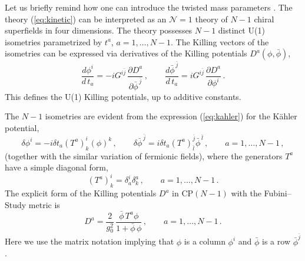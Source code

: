 \documentclass[epsfig,12pt]{article}
\def\beq{\begin{equation}}
\def\eeq{\end{equation}}
\def\beq{\begin{equation}}
\def\eeq{\end{equation}}
\begin{document}
Let us  briefly remind how one can introduce the twisted mass parameters \cite{twisted, Dor}.
The theory (\ref{eq:kinetic}) can be interpreted as an ${\mathcal N}=1$ theory of $N-1$ chiral superfields 
in four dimensions.  The theory possesses $N-1$ distinct   U(1) isometries 
parametrized by $t^{a}$, $a=1,\ldots,N-1$.
The Killing vectors of the isometries can be expressed via derivatives of the Killing 
potentials $D^{a}(\phi, \bar\phi)$,
\begin{equation}
\label{eq:KillD}
\frac{{d}\phi^{i}}{{  d}\,t_{a}}=-iG^{i\bar j}\,\frac{\partial D^{a}}{\partial \bar\phi^{ \,\bar j}}
\,,\qquad 
\frac{{d}\bar\phi^{ \,\bar j}}{{  d}\,t_{a}}=iG^{i\bar j}\,\frac{\partial D^{a}}{\partial \phi^{i}}\,.
\end{equation}
This defines the U(1) Killing potentials, up to additive constants.

The $N -1$ isometries are
 evident from the expression (\ref{eq:kahler}) for the K\"ahler potential, 
\begin{equation}
\label{eq:iso}
\delta\phi^{i}=-i\delta t_{a} (T^{a})^{i}_{k}(\phi)^{k}\,,\qquad 
\delta\bar\phi^{\,\bar j}=i\delta t_{a}(T^{a})^{\bar j}_{\bar l}\bar\phi^{\,\bar l}\,,
\qquad a=1,\ldots, N-1\,,
\end{equation}
(together with the similar variation of fermionic fields),
where the  generators $T^{a}$ have a simple diagonal form,
\begin{equation}
(T^{a})^{i}_{k}=\delta^{i}_{a}\delta^{a}_{k}\,, \qquad a=1,\ldots,N-1\,.
\end{equation}
 The explicit form of the Killing potentials $D^{a}$ in CP$(N\!-\!1)$ with the Fubini--Study metric is
\beq
\label{eq:KillF}
D^{a}=\frac{2}{g_{0}^{2}}\,\frac{\bar\phi\, T^{a}\phi}{1+\bar\phi\,\phi}\,,
\qquad a=1,\ldots,N-1\,.
\eeq
Here we use the matrix notation implying that $\phi$ is a column $\phi^{i}$ and 
$\bar\phi$ is a row $\bar\phi^{ \bar j}$.
\end{document}
